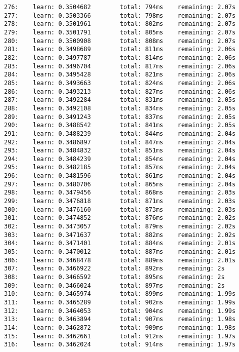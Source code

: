\documentclass[11pt]{article}
\begin{document}
\begin{Verbatim}[commandchars=\\\{\}]
276:    learn: 0.3504682        total: 794ms    remaining: 2.07s
277:    learn: 0.3503366        total: 798ms    remaining: 2.07s
278:    learn: 0.3501961        total: 802ms    remaining: 2.07s
279:    learn: 0.3501791        total: 805ms    remaining: 2.07s
280:    learn: 0.3500908        total: 808ms    remaining: 2.07s
281:    learn: 0.3498689        total: 811ms    remaining: 2.06s
282:    learn: 0.3497787        total: 814ms    remaining: 2.06s
283:    learn: 0.3496704        total: 817ms    remaining: 2.06s
284:    learn: 0.3495428        total: 821ms    remaining: 2.06s
285:    learn: 0.3493663        total: 824ms    remaining: 2.06s
286:    learn: 0.3493213        total: 827ms    remaining: 2.06s
287:    learn: 0.3492284        total: 831ms    remaining: 2.05s
288:    learn: 0.3492108        total: 834ms    remaining: 2.05s
289:    learn: 0.3491243        total: 837ms    remaining: 2.05s
290:    learn: 0.3488542        total: 841ms    remaining: 2.05s
291:    learn: 0.3488239        total: 844ms    remaining: 2.04s
292:    learn: 0.3486897        total: 847ms    remaining: 2.04s
293:    learn: 0.3484832        total: 851ms    remaining: 2.04s
294:    learn: 0.3484239        total: 854ms    remaining: 2.04s
295:    learn: 0.3482185        total: 857ms    remaining: 2.04s
296:    learn: 0.3481596        total: 861ms    remaining: 2.04s
297:    learn: 0.3480706        total: 865ms    remaining: 2.04s
298:    learn: 0.3479456        total: 868ms    remaining: 2.03s
299:    learn: 0.3476818        total: 871ms    remaining: 2.03s
300:    learn: 0.3476160        total: 873ms    remaining: 2.03s
301:    learn: 0.3474852        total: 876ms    remaining: 2.02s
302:    learn: 0.3473057        total: 879ms    remaining: 2.02s
303:    learn: 0.3471637        total: 882ms    remaining: 2.02s
304:    learn: 0.3471401        total: 884ms    remaining: 2.01s
305:    learn: 0.3470012        total: 887ms    remaining: 2.01s
306:    learn: 0.3468478        total: 889ms    remaining: 2.01s
307:    learn: 0.3466922        total: 892ms    remaining: 2s
308:    learn: 0.3466592        total: 895ms    remaining: 2s
309:    learn: 0.3466024        total: 897ms    remaining: 2s
310:    learn: 0.3465974        total: 899ms    remaining: 1.99s
311:    learn: 0.3465289        total: 902ms    remaining: 1.99s
312:    learn: 0.3464053        total: 904ms    remaining: 1.99s
313:    learn: 0.3463894        total: 907ms    remaining: 1.98s
314:    learn: 0.3462872        total: 909ms    remaining: 1.98s
315:    learn: 0.3462661        total: 912ms    remaining: 1.97s
316:    learn: 0.3462024        total: 914ms    remaining: 1.97s

\end{Verbatim}
\end{document}
